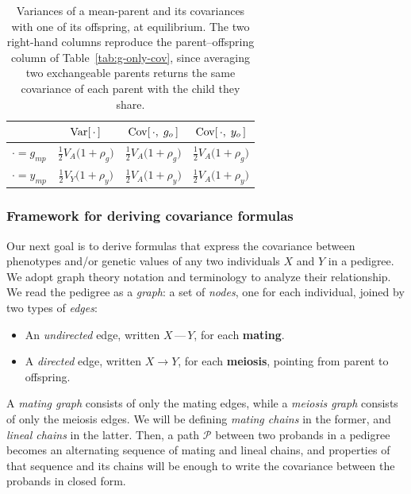 \documentclass[12pt]{article}
\begin{document}
\begin{table}[H]
    \begin{floatcard}
    \renewcommand{\arraystretch}{1.9}
    \setlength{\tabcolsep}{10pt}
    \footnotesize
    \begin{tabular}{l|ccc}
            & $\mathrm{Var}[\,\cdot\,]$
            & $\mathrm{Cov}[\,\cdot,\; g_o\,]$
            & $\mathrm{Cov}[\,\cdot,\; y_o\,]$ \\
        \hline
        $\cdot = g_{mp}$
            & $\tfrac12 V_A\big(1+\rho_g\big)$
            & $\tfrac12 V_A\big(1+\rho_g\big)$
            & $\tfrac12 V_A\big(1+\rho_g\big)$ \\
        $\cdot = y_{mp}$
            & $\tfrac12 V_Y\big(1+\rho_y\big)$
            & $\tfrac12 V_A\big(1+\rho_y\big)$
            & $\tfrac12 V_A\big(1+\rho_y\big)$ \\
    \end{tabular}
    \caption{%
        Variances of a mean-parent and its covariances with one of its offspring, at equilibrium.
        The two right-hand columns reproduce the parent--offspring column of Table~\ref{tab:g-only-cov}, since averaging two exchangeable parents returns the same covariance of each parent with the child they share.%
    }
    \label{tab:mean-parent-cov}
    \end{floatcard}
\end{table}

\fi

\subsubsection{Framework for deriving covariance formulas}
Our next goal is to derive formulas that express the covariance between phenotypes and/or genetic values of any two individuals $X$ and $Y$ in a pedigree.
We adopt graph theory notation and terminology to analyze their relationship.
We read the pedigree as a \emph{graph}: a set of \emph{nodes}, one for each individual, joined by two types of \emph{edges}:

\begin{itemize}
    \item An \emph{undirected} edge, written $X \,\text{---}\, Y$, for each \textbf{mating}.
    \item A \emph{directed} edge, written $X \rightarrow Y$, for each \textbf{meiosis}, pointing from parent to offspring.
\end{itemize}


    A \emph{mating graph} consists of only the mating edges, while a \emph{meiosis graph} consists of only the meiosis edges.
    We will be defining \emph{mating chains} in the former, and \emph{lineal chains} in the latter.
    Then, a path $\mathcal{P}$ between two probands in a pedigree becomes an alternating sequence of mating and lineal chains, and properties of that sequence and its chains will be enough to write the covariance between the probands in closed form.
\end{document}
